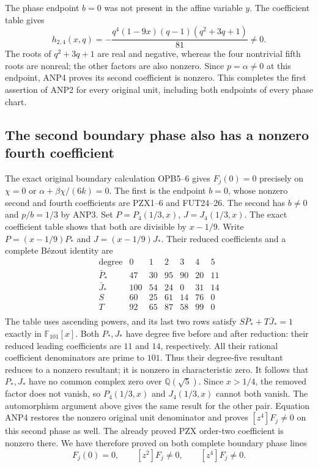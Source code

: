 \documentclass[11pt]{article}
\begin{document}
The phase endpoint $b=0$ was not present in the affine variable $y$.
The coefficient table gives
\[
 h_{2,4}(x,q)=
       -\frac{q^4(1-9x)(q-1)(q^2+3q+1)}{81}\ne0.
 \tag{ANP14}
\]
The roots of $q^2+3q+1$ are real and negative, whereas the four
nontrivial fifth roots are nonreal; the other factors are also nonzero.
Since $p=\alpha\ne0$ at this endpoint, ANP4 proves its second
coefficient is nonzero. This completes the first assertion of ANP2
for every original unit, including both endpoints of every phase chart.

\subsection{The second boundary phase also has a nonzero fourth coefficient}
The exact original boundary calculation OPB5--6 gives
$F_j(0)=0$ precisely on $\chi=0$ or $\alpha+\beta\chi/(6k)=0$.
The first is the endpoint $b=0$, whose nonzero second and fourth
coefficients are PZX1--6 and FUT24--26.
The second has $b\ne0$ and $p/b=1/3$ by ANP3.
Set $P=P_4(1/3,x)$, $J=J_4(1/3,x)$.
The exact coefficient table shows that both are divisible by
$x-1/9$. Write $P=(x-1/9)P_*$ and $J=(x-1/9)J_*$.
Their reduced coefficients and a complete B\'ezout identity are
\[
\begin{array}{c|rrrrrr}
\text{degree}&0&1&2&3&4&5\\\hline
\bar P_*&47&30&95&90&20&11\\
\bar J_*&100&54&24&0&31&14\\
S&60&25&61&14&76&0\\
T&92&65&87&58&99&0\\
\end{array}\tag{ANP18}
\]
The table uses ascending powers, and its last two rows satisfy
$S\bar P_*+T\bar J_*=1$ exactly in $\mathbb F_{101}[x]$.
Both $P_*,J_*$ have degree five before and after reduction: their
reduced leading coefficients are $11$ and $14$, respectively.
All their rational coefficient denominators are prime to $101$.
Thus their degree-five resultant reduces to a nonzero resultant;
it is nonzero in characteristic zero. It follows that
$P_*,J_*$ have no common complex zero over $\mathbb Q(\sqrt5)$.
Since $x>1/4$, the removed factor does not vanish, so
$P_4(1/3,x)$ and $J_4(1/3,x)$ cannot both vanish.
The automorphism argument above gives the same result for the other
pair. Equation ANP4 restores the nonzero original unit denominator
and proves $[z^4]F_j\ne0$ on this second phase as well.
The already proved PZX order-two coefficient is nonzero there.
We have therefore proved on both complete boundary phase lines
\[
          F_j(0)=0,\qquad [z^2]F_j\ne0,
                     \qquad [z^4]F_j\ne0.
 \tag{ANP15}
\]
\end{document}
